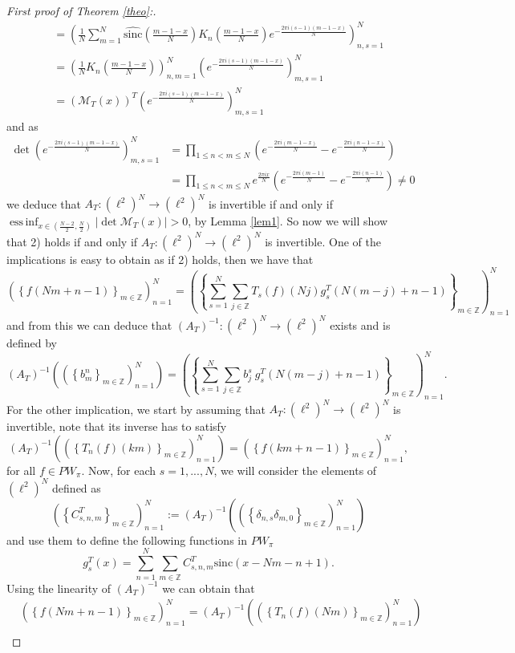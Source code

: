 \documentclass[10pt,a4paper]{amsart}
\newcommand{\Z}{{\mathbb Z}}
\newcommand{\abs}[1]{\left\vert#1\right\vert}
\DeclareMathOperator{\essinf}{ess\,inf}
\newcommand{\pa}[1]{\left(#1\right)}
\newcommand{\sinc}{\mathrm{sinc}}
\newcommand{\suc}[1]{\left\{#1\right\}}
\begin{document}
\begin{proof}[First proof of Theorem \ref{theo}:]
\begin{align*}
		&\quad = \pa{\frac{1}{N} \sum_{m=1}^N \widehat{\sinc}\pa{\frac{m-1-x}{N}} K_n\pa{\frac{m-1-x}{N}}
		e^{-\frac{2\pi i \pa{s-1} \pa{m-1-x}}{N}}}_{n,s=1}^N \\
		&\quad = \pa{\frac{1}{N}K_n\pa{\frac{m-1-x}{N}}}_{n,m=1}^N 
        \pa{e^{-\frac{2\pi i (s-1) (m-1-x)}{N}}}_{m,s=1}^N \\
		&\quad = \pa{\mathcal{M}_T(x)}^T \pa{e^{-\frac{2\pi i (s-1) (m-1-x)}{N}}}_{m,s=1}^N 
	\end{align*}
	and as
	\begin{align*}
		\det \pa{e^{-\frac{2\pi i (s-1) (m-1-x)}{N}}}_{m,s=1}^N
		&= \prod_{1\leq n < m \leq N} \pa{e^{-\frac{2\pi i (m-1-x)}{N}}-e^{-\frac{2\pi i (n-1-x)}{N}}} \\
		&= \prod_{1\leq n < m \leq N} e^\frac{2\pi i x}{N} 
		\pa{e^{-\frac{2\pi i (m-1)}{N}}-e^{-\frac{2\pi i (n-1)}{N}}} \neq 0
	\end{align*}
	we deduce that $A_T:\pa{\ell^2}^N\to\pa{\ell^2}^N$ is invertible if and only if $\essinf_{x\in \pa{\frac{N-2}{2},\frac{N}{2}}} \abs{\det \mathcal{M}_T(x)}>0$, by Lemma \ref{lem1}. So now we will show that 2) holds if and only if $A_T:\pa{\ell^2}^N\to\pa{\ell^2}^N$ is invertible. One of the implications is easy to obtain as if 2) holds, then we have that
	$$\pa{\suc{f(Nm+n-1)}_{m\in\Z}}_{n=1}^N
	=\pa{\suc{\sum_{s=1}^N \sum_{j\in\Z} T_s(f)(Nj) g^T_s(N(m-j)+n-1)}_{m\in\Z}}_{n=1}^N$$
	and from this we can deduce that $\pa{A_T}^{-1}:\pa{\ell^2}^N\to\pa{\ell^2}^N$ exists and is defined by
	$$\pa{A_T}^{-1}\pa{\pa{\suc{b^n_m}_{m\in\Z}}_{n=1}^N}
	=\pa{\suc{\sum_{s=1}^N \sum_{j\in\Z} b_j^s \ g^T_s(N(m-j)+n-1)}_{m\in\Z}}_{n=1}^N.$$
	For the other implication, we start by assuming that $A_T:\pa{\ell^2}^N\to\pa{\ell^2}^N$ is invertible, 
	note that its inverse has to satisfy
	$$\pa{A_T}^{-1}\pa{\pa{\left\{ T_n(f)\pa{km}\right\}_{m\in\Z}}_{n=1}^N}
	=\pa{\left\{ f(km+n-1) \right\}_{m\in\Z}}_{n=1}^N,$$
	for all $f\in PW_\pi$. Now, for each $s=1,...,N$, we will consider the elements of $\pa{\ell^2}^N$ defined as
    $$\pa{\suc{C^T_{s,n,m}}_{m\in\Z}}_{n=1}^N:=\pa{A_T}^{-1}\pa{\pa{\suc{\delta_{n,s}\delta_{m,0}}_{m\in\Z}}_{n=1}^N}$$
    and use them to define the following functions in $PW_\pi$
    $$g^T_s(x)= \sum_{n=1}^N \sum_{m\in\Z} C^T_{s,n,m} \sinc (x-Nm-n+1).$$
    Using the linearity of $\pa{A_T}^{-1}$ we can obtain that
    \begin{align*}
		&\pa{\left\{ f(Nm+n-1) \right\}_{m\in\Z}}_{n=1}^N
		= \pa{A_T}^{-1}\pa{\pa{\left\{ T_n(f)(Nm)\right\}_{m\in\Z}}_{n=1}^N} \\

\end{align*}
\end{proof}
\end{document}
